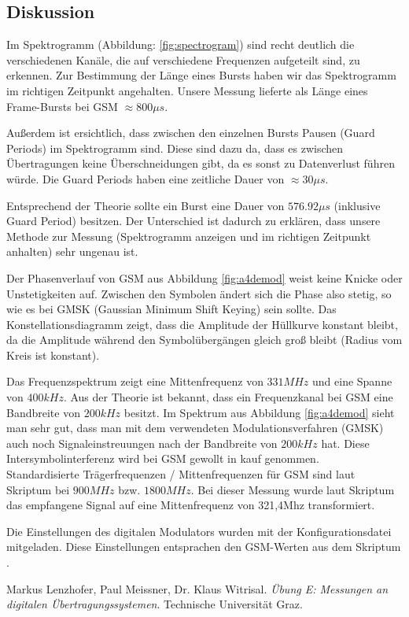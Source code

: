\documentclass[12pt,a4paper,ngerman]{article}
\begin{document}
\subsection{Diskussion}

Im Spektrogramm (Abbildung: \ref{fig:spectrogram}) sind recht deutlich die verschiedenen Kanäle, die auf verschiedene Frequenzen aufgeteilt sind, zu erkennen. Zur Bestimmung der Länge eines Bursts haben wir das Spektrogramm im richtigen Zeitpunkt angehalten. Unsere Messung lieferte als Länge eines Frame-Bursts bei GSM $\approx 800 \mu s$. 

Außerdem ist ersichtlich, dass zwischen den einzelnen Bursts Pausen (Guard Periods) im Spektrogramm sind. Diese sind dazu da, dass es zwischen Übertragungen keine Überschneidungen gibt, da es sonst zu Datenverlust führen würde. Die Guard Periods haben eine zeitliche Dauer von $\approx 30 \mu s$.

Entsprechend der Theorie sollte ein Burst eine Dauer von $576.92 \mu s$ (inklusive Guard Period) besitzen. Der Unterschied ist dadurch zu erklären, dass unsere Methode zur Messung (Spektrogramm anzeigen und im richtigen Zeitpunkt anhalten) sehr ungenau ist.

Der Phasenverlauf von GSM aus Abbildung \ref{fig:a4demod} weist keine Knicke oder Unstetigkeiten auf. Zwischen den Symbolen ändert sich die Phase also stetig, so wie es bei GMSK (Gaussian Minimum Shift Keying) sein sollte. Das Konstellationsdiagramm zeigt, dass die Amplitude der Hüllkurve konstant bleibt, da die Amplitude während den Symbolübergängen gleich groß bleibt (Radius vom Kreis ist konstant).

Das Frequenzspektrum zeigt eine Mittenfrequenz von $331 MHz$ und eine Spanne von $400 kHz$. Aus der Theorie ist bekannt, dass ein Frequenzkanal bei GSM eine Bandbreite von $200 kHz$ besitzt. Im Spektrum aus Abbildung \ref{fig:a4demod} sieht man sehr gut, dass man mit dem verwendeten Modulationsverfahren (GMSK) auch noch Signaleinstreuungen nach der Bandbreite von $200 kHz$ hat. Diese Intersymbolinterferenz wird bei GSM gewollt in kauf genommen.\\

Standardisierte Trägerfrequenzen / Mittenfrequenzen für GSM sind laut Skriptum bei $900 MHz$ bzw. $1800 MHz$. Bei dieser Messung wurde laut Skriptum \cite[19]{skript} das empfangene Signal auf eine Mittenfrequenz von 321,4Mhz transformiert.

Die Einstellungen des digitalen Modulators wurden mit der Konfigurationsdatei mitgeladen. Diese Einstellungen entsprachen den GSM-Werten aus dem Skriptum \cite[17]{skript}.

\begin{thebibliography}{9}

  Markus Lenzhofer, Paul Meissner, Dr. Klaus Witrisal.
  \emph{Übung E: Messungen an digitalen Übertragungssystemen}.
  Technische Universität Graz.

\end{thebibliography}


 



   
\end{document}
